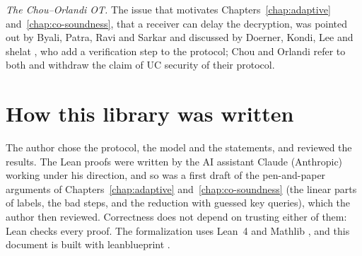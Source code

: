 \emph{The Chou--Orlandi OT.} The issue that motivates Chapters~\ref{chap:adaptive}
and~\ref{chap:co-soundness}, that a receiver can delay the decryption, was pointed out by Byali,
Patra, Ravi and Sarkar \cite[Sect.~3]{BPRS17} and discussed by Doerner, Kondi, Lee and shelat
\cite[App.~A]{DKLs18}, who add a verification step to the protocol; Chou and Orlandi refer to both
\cite[Sect.~1.1]{CO15} and withdraw the claim of UC security of their protocol.

\section*{How this library was written}

The author chose the protocol, the model and the statements, and reviewed the results. The Lean
proofs were written by the AI assistant Claude (Anthropic) working under his direction, and so was
a first draft of the pen-and-paper arguments of Chapters~\ref{chap:adaptive}
and~\ref{chap:co-soundness} (the linear parts of labels, the bad steps, and the reduction with
guessed key queries), which the author then reviewed. Correctness does not depend on trusting
either of them: Lean checks every proof. The formalization uses Lean~4 \cite{MU21} and
Mathlib \cite{Mathlib20}, and this document is built with leanblueprint \cite{Mas}.
